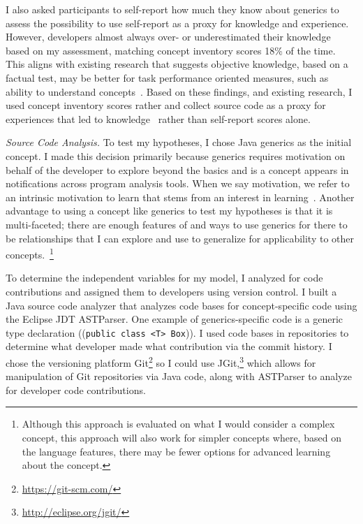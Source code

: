 \documentclass{llncs}
\begin{document}
I also asked participants to self-report how much they know about generics to assess the possibility to use self-report as a proxy for knowledge and experience. However, developers almost always over- or underestimated their knowledge based on my assessment, matching concept inventory scores 18\% of the time. This aligns with existing research that suggests objective knowledge, based on a factual test, may be better for task performance oriented measures, such as ability to understand concepts~\cite{cole1992exploring,raju1995differential}. Based on these findings, and existing research, I used concept inventory scores rather and collect source code as a proxy for experiences that led to knowledge~\cite{argote2011organizational,raju1995differential} rather than self-report scores alone.

\vspace{0.5em}
\noindent\textit{Source Code Analysis.}
To test my hypotheses, I chose Java generics as the initial concept. I made this decision primarily because generics requires motivation on behalf of the developer to explore beyond the basics and is a concept appears in notifications across program analysis tools. When we say motivation, we refer to an intrinsic motivation to learn that stems from an interest in learning~\cite{krapp1999interest,hall2008we}.		
Another advantage to using a concept like generics to test my hypotheses is that it is multi-faceted; there are enough features of and ways to use generics for there to be relationships that I can explore and use to generalize for applicability to other concepts.~\footnote{Although this approach is evaluated on what I would consider a complex concept, this approach will also work for simpler concepts where, based on the language features, there may be fewer options for advanced learning about the concept.}

To determine the independent variables for my model, I analyzed for code contributions and assigned them to developers using version control. 
I built a Java source code analyzer that analyzes code bases for concept-specific code using the Eclipse JDT ASTParser. 
One example of generics-specific code is a generic type declaration ((\texttt{public class <T> Box})).
I used code bases in repositories to determine what developer made what contribution via the commit history. 
I chose the versioning platform Git\footnote{\url{https://git-scm.com/}} so I could use JGit,\footnote{\url{http://eclipse.org/jgit/}} which allows for manipulation of Git repositories via Java code, along with ASTParser to analyze for developer code contributions.
\end{document}
